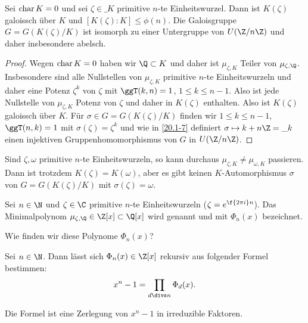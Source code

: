 \begin{kor} \label{20.1-8}
	Sei $\operatorname{char} K = 0$ und sei $\zeta \in \_K$ primitive $n$-te Einheitswurzel.
	Dann ist $K(\zeta)$ galoissch über $K$ und $[K(\zeta) : K] \le \phi(n)$.
	Die Galoisgruppe $G = G(K(\zeta) / K)$ ist isomorph zu einer Untergruppe von $U(\Z / n\Z)$ und daher insbesondere abelsch.
	\begin{proof}
		Wegen $\operatorname{char} K = 0$ haben wir $\Q \subset K$ und daher ist $\mu_{\zeta,K}$ Teiler von $\mu_{\zeta, \Q}$.
		Insbesondere sind alle Nullstellen von $\mu_{\zeta, K}$ primitive $n$-te Einheitswurzeln und daher eine Potenz $\zeta^k$ von $\zeta$ mit $\ggT(k,n) = 1$, $1 \le k \le n-1$.
		Also ist jede Nullstelle von $\mu_{\zeta, K}$ Potenz von $\zeta$ und daher in $K(\zeta)$ enthalten.
		Also ist $K(\zeta)$ galoissch über $K$.
		Für $\sigma \in G = G(K(\zeta) / K)$ finden wir $1 \le k \le n-1$, $\ggT(n,k) = 1$ mit $\sigma(\zeta) = \zeta^k$ und wie in \ref{20.1-7} definiert $\sigma \mapsto k + n \Z = \_k$ einen injektiven Gruppenhomomorphismus von $G$ in $U(\Z / n\Z)$.
	\end{proof}
	\begin{note}
		Sind $\zeta, \omega$ primitive $n$-te Einheitswurzeln, so kann durchaus $\mu_{\zeta, K} \neq \mu_{\omega, K}$ passieren.
		Dann ist trotzdem $K(\zeta) = K(\omega)$, aber es gibt keinen $K$-Automorphismus $\sigma$ von $G = G(K(\zeta) / K)$ mit $\sigma(\zeta) = \omega$.
	\end{note}
\end{kor}

\begin{df} \label{20.1-9}
	Sei $n \in \N$ und $\zeta \in \C$ primitive $n$-te Einheitswurzeln (\oBdA $\zeta = e^{\f{2\pi i}n}$).
	Das Minimalpolynom $\mu_{\zeta, \Q} \in \Z[x] \subset \Q[x]$ wird  genannt und mit $\Phi_n(x)$ bezeichnet.
\end{df}

Wie finden wir diese Polynome $\Phi_n(x)$?

\begin{st} \label{20.1-10}
	Sei $n \in \N$.
	Dann lässt sich $\Phi_n(x) \in \Z[x]$ rekursiv aus folgender Formel bestimmen:
	\[
		x^n - 1 = \prod_{d \divs n} \Phi_d(x).
	\]
	\begin{note}
		Die Formel ist eine Zerlegung von $x^n - 1$ in irreduzible Faktoren.
	\end{note}
\end{st}

